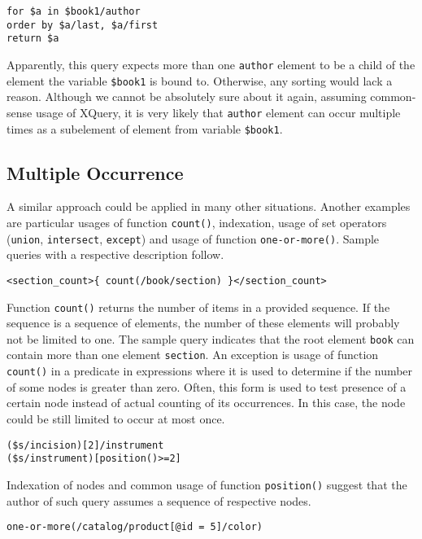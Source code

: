 \begin{verbatim}
for $a in $book1/author 
order by $a/last, $a/first
return $a
\end{verbatim}

Apparently, this query expects more than one \texttt{author} element to be a child of the element the variable \texttt{\$book1} is bound to. Otherwise, any sorting would lack a reason. Although we cannot be absolutely sure about it again, assuming common-sense usage of XQuery, it is very likely that \texttt{author} element can occur multiple times as a subelement of element from variable \texttt{\$book1}.

\subsection{Multiple Occurrence}
A similar approach could be applied in many other situations. Another examples are particular usages of function \texttt{count()}, indexation, usage of set operators (\texttt{union}, \texttt{intersect}, \texttt{except}) and usage of function \texttt{one-or-more()}. Sample queries with a respective description follow.

\begin{verbatim}
<section_count>{ count(/book/section) }</section_count>
\end{verbatim}

Function \texttt{count()} returns the number of items in a provided sequence. If the sequence is a sequence of elements, the number of these elements will probably not be limited to one. The sample query indicates that the root element \texttt{book} can contain more than one element \texttt{section}.
An exception is usage of function \texttt{count()} in a predicate in expressions where it is used to determine if the number of some nodes is greater than zero. Often, this form is used to test presence of a certain node instead of actual counting of its occurrences. In this case, the node could be still limited to occur at most once.

\begin{verbatim}
($s/incision)[2]/instrument
($s/instrument)[position()>=2]
\end{verbatim}

Indexation of nodes and common usage of function \texttt{position()} suggest that the author of such query assumes a sequence of respective nodes.

\begin{verbatim}
one-or-more(/catalog/product[@id = 5]/color)
\end{verbatim}

